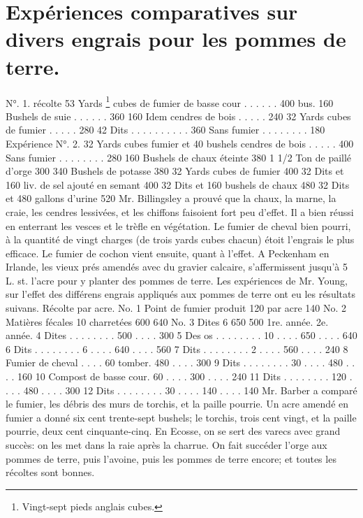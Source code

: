 \section{Expériences comparatives sur divers engrais pour les pommes de terre.}
N°. 1. récolte
53 Yards \footnote{Vingt-sept pieds anglais cubes.} cubes de fumier de basse cour . . . . . . 400 bus.
160 Bushels de suie . . . . . . 360
160 Idem cendres de bois . . . . . 240
32 Yards cubes de fumier . . . . . 280
42 Dits . . . . . . . . . . 360
Sans fumier . . . . . . . . 180
Expérience N°. 2.
32 Yards cubes fumier et 40 bushels cendres de bois . . . . . 400
Sans fumier . . . . . . . . 280\setcounter{page}{280} 160 Bushels de chaux éteinte 380
1 1/2 Ton de paillé d'orge 300
340 Bushels de potasse 380
32 Yards cubes de fumier 400
32 Dits et 160 liv. de sel ajouté en semant 400
32 Dits et 160 bushels de chaux 480
32 Dits et 480 gallons d'urine 520
Mr. Billingsley a prouvé que la chaux, la marne, la craie, les cendres lessivées, et les chiffons faisoient fort peu d'effet. Il a bien réussi en enterrant les vesces et le trèfle en végétation. Le fumier de cheval bien pourri, à la quantité de vingt charges (de trois yards cubes chacun) étoit l'engrais le plus efficace. Le fumier de cochon vient ensuite, quant à l'effet.
A Peckenham en Irlande, les vieux prés amendés avec du gravier calcaire, s'affermissent jusqu'à 5 L. st. l'acre pour y planter des pommes de terre.
Les expériences de Mr. Young, sur l'effet des différens engrais appliqués aux pommes de terre ont eu les résultats suivans.
Récolte par acre.
No. 1 Point de fumier produit 120 par acre 140
No. 2 Matières fécales 10 charretées 600 640
No. 3 Dites 6 650 500\setcounter{page}{281} 
1re. année. 2e. année.
4 Dites . . . . . . . . 500 . . . . 300
5 Des os . . . . . . . . 10 . . . . 650 . . . . 640
6 Dits . . . . . . . . 6 . . . . 640 . . . . 560
7 Dits . . . . . . . . 2 . . . . 560 . . . . 240
8 Fumier de cheval . . . . 60 tomber. 480 . . . . 300
9 Dits . . . . . . . . 30 . . . . 480 . . . . 160
10 Compost de basse cour. 60 . . . . 300 . . . . 240
11 Dits . . . . . . . . 120 . . . . 480 . . . . 300
12 Dits . . . . . . . . 30 . . . . 140 . . . . 140
Mr. Barber a comparé le fumier, les débris des murs de torchis, et la paille pourrie. Un acre amendé en fumier a donné six cent trente-sept bushels; le torchis, trois cent vingt, et la paille pourrie, deux cent cinquante-cinq.
En Ecosse, on se sert des varecs avec grand succès: on les met dans la raie après la charrue. On fait succéder l'orge aux pommes de terre, puis l'avoine, puis les pommes de terre encore; et toutes les récoltes sont bonnes.
